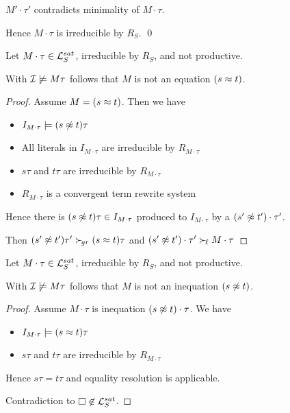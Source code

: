 \documentclass[%
handout,
]{beamer}
\begin{document}
\begin{frame}[allowframebreaks]
\begin{itemize}
            $M'\cdot\tau'$ contradicts minimality of $M\cdot\tau$.

        \end{itemize}

        Hence $M\cdot\tau$ is irreducible by $R_S$.
        \hfill\qed

\end{frame}

\begin{frame}

    \begin{lemma}\label{equation}
        Let $M\cdot\tau\in\mathcal{L}_S^{sat}$,
        irreducible by $R_S$, and not productive.

        With $\mathcal{I}\not\models M\tau$ follows that $M$ is not an equation $(s\approx t)$.

    \begin{proof}
        Assume $M = (s\approx t)$. Then we have
        \begin{itemize}
            \item $I_{M\cdot\tau}\models (s\not\approx t)\tau$
            \item All literals in $I_{M\cdot\tau}$ are irreducible by $R_{M\cdot\tau}$
            \item $s\tau$ and $t\tau$ are irreducible by $R_{M\cdot\tau}$
            \item $R_{M\cdot\tau}$ is a convergent term rewrite system
        \end{itemize}
        Hence there is $(s\not\approx t)\tau\in I_{M\cdot\tau}$
        produced to $I_{M\cdot\tau}$ by a $(s'\not\approx t')\cdot\tau'$.

        Then $(s'\not\approx t')\tau'\mathrel\succ_{\!gr} (s\approx t)\tau$ and $(s'\not\approx t')\cdot\tau'\mathrel\succ_{\!\ell} M\cdot\tau$
    \end{proof}
    \end{lemma}
\end{frame}
\begin{frame}
    \begin{lemma}\label{inequation}
        Let $M\cdot\tau\in\mathcal{L}_S^{sat}$,
        irreducible by $R_S$, and not productive.

        With $\mathcal{I}\not\models M\tau$ follows that $M$ is not an inequation $(s\not\approx t)$.
        \begin{proof}
        Assume $M\cdot\tau$ is inequation $(s\not\approx t)\cdot\tau$. We have
        \begin{itemize}
            \item $I_{M\cdot\tau}\models (s\approx t)\tau$
            \item $s\tau$ and $t\tau$ are irreducible by $R_{M\cdot\tau}$
        \end{itemize}
        Hence $s\tau = t\tau$ and equality resolution is applicable.

        Contradiction to $\square\not\in\mathcal{L}_S^{sat}$.
    \end{proof}
    \end{lemma}

\end{frame}
\end{document}
